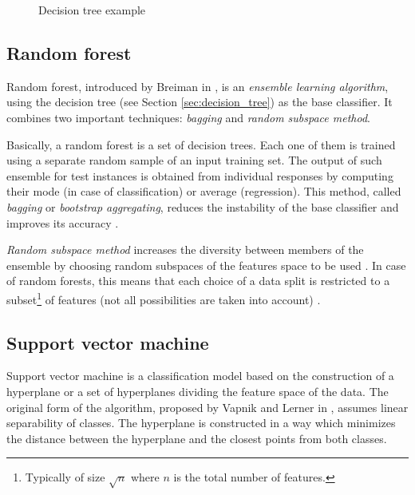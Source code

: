 \documentclass{pracamgr}
\begin{document}
\begin{figure}[h]
\centering

\caption[Decision tree example]{Decision tree example\footnotemark}
\label{fig:decision_tree}
\end{figure}

\subsection{Random forest}
\label{sec:random_forest}

Random forest, introduced by Breiman in \cite{random_forests}, is an \emph{ensemble learning algorithm}, using the decision tree (see Section \ref{sec:decision_tree}) as the base classifier. It combines two important techniques: \emph{bagging} and \emph{random subspace method}.

Basically, a random forest is a set of decision trees. Each one of them is trained using a separate random sample of an input training set. The output of such ensemble for test instances is obtained from individual responses by computing their mode (in case of classification) or average (regression). This method, called \emph{bagging} or \emph{bootstrap aggregating}, reduces the instability of the base classifier and improves its accuracy \cite{bagging}.

\emph{Random subspace method} increases the diversity between members of the ensemble by choosing random subspaces of the features space to be used \cite[p.~828]{encyclopedia}. In case of random forests, this means that each choice of a data split is restricted to a subset\footnote{Typically of size $\sqrt{n}$ where $n$ is the total number of features.} of features (not all possibilities are taken into account) \cite{random_forests}.
 
\subsection{Support vector machine}
\label{sec:svm}
Support vector machine is a classification model based on the construction of a hyperplane or a set of hyperplanes dividing the feature space of the data. The original form of the algorithm, proposed by Vapnik and Lerner in \cite{svm}, assumes linear separability of classes. The hyperplane is constructed in a way which minimizes the distance between the hyperplane and the closest points from both classes.
\end{document}
